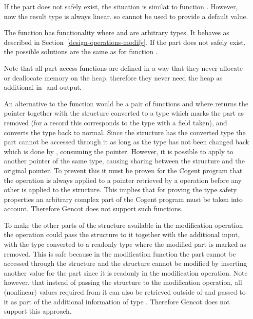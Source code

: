 If the part does not safely exist, the situation is similat to function . However, now the result 
type  is always linear, so  cannot be used to provide a default value.

The function  has functionality  where  and  are
arbitrary types. It behaves as described in Section~\ref{design-operations-modify}. If the part does not safely exist, 
the possible solutions are the same as for function .

Note that all part access functions are defined in a way that they never allocate or deallocate memory on the heap.
therefore they never need the heap as additional in- and output.

An alternative to the function  would be a pair of functions  and  where 
returns the pointer together with the structure converted to a type which marks the part as removed (for a record this
corresponds to the type with a field taken), and  converts the type back to normal. 
Since the structure has the converted type the part cannot be accessed through it
as long as the type has not been changed back which is done by , consuming the pointer.
However, it is possible to apply  to another pointer of the same type, causing sharing between the 
structure and the original pointer. To prevent this it must be proven for the Cogent program that the 
operation is always applied to a pointer retrieved by a  operation before any other 
is applied to the structure. This implies that
for proving the type safety properties an arbitrary complex part of the Cogent program must be taken into
account. Therefore Gencot does not support such functions.

To make the other parts of the structure available in the modification operation the  operation could
pass the structure to it together with the additional input, with the type converted to a readonly type where the modified
part is marked as removed. This is safe because in the modification function the part cannot be accessed
through the structure and the structure cannot be modified by inserting another value for the part since it is
readonly in the modification operation. Note however, that instead of passing the structure to the modification operation,
all (nonlinear) values required from it can also be retrieved outside of  and passed to it as part of the 
additional information of type . Therefore Gencot does not support this approach.

